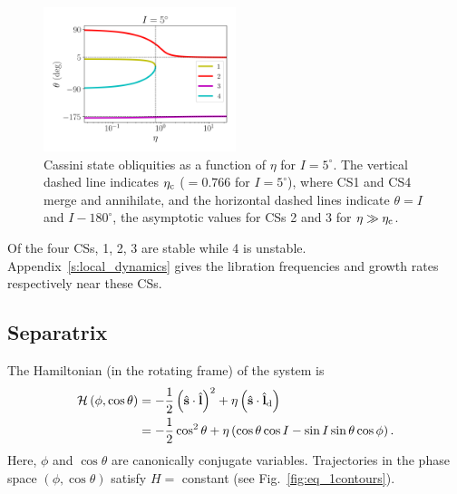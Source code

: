 \documentclass[
        fleqn,
        usenatbib,
    ]{mnras}
\newcommand*{\bm}[1]{\boldsymbol{\mathbf{#1}}}
\newcommand*{\uv}[1]{\hat{\bm{#1}}}
\newcommand*{\p}[1]{\left(#1\right)}
\begin{document}
\begin{figure}
    \includegraphics[width=0.5\textwidth]{plots_diskdisp/2_cs_locs.png}
    \caption{Cassini state obliquities as a function of $\eta$ for $I =
    5^\circ$. The vertical dashed line indicates $\eta_{\rm c}$ ($= 0.766$ for
    $I = 5^\circ$), where CS1 and CS4 merge and annihilate, and the horizontal
    dashed lines indicate $\theta = I$ and $I - 180^\circ$, the asymptotic
    values for CSs 2 and 3 for $\eta \gg \eta_{\rm c}$.}\label{fig:cs_locs}
\end{figure}

Of the four CSs, 1, 2, 3 are stable while 4 is unstable.
Appendix~\ref{s:local_dynamics} gives the libration frequencies and growth rates
respectively near these CSs.

\subsection{Separatrix}

The Hamiltonian (in the rotating frame) of the system is
\begin{align}
    \mathcal{H}\p{\phi, \cos \theta} &= -\frac{1}{2}\p{\uv{s} \cdot \uv{l}}^2
            + \eta \p{\uv{s} \cdot \uv{l}_{\rm d}}\nonumber\\
        &= -\frac{1}{2}\cos^2\theta
            + \eta \p{\cos \theta \cos I - \sin I \sin \theta \cos \phi}
                \label{eq:H}.
\end{align}
Here, $\phi$ and $\cos \theta$ are canonically conjugate variables. Trajectories
in the phase space $\p{\phi, \cos \theta}$ satisfy $H = $ constant (see
Fig.~\ref{fig:eq_1contours}).
\end{document}
